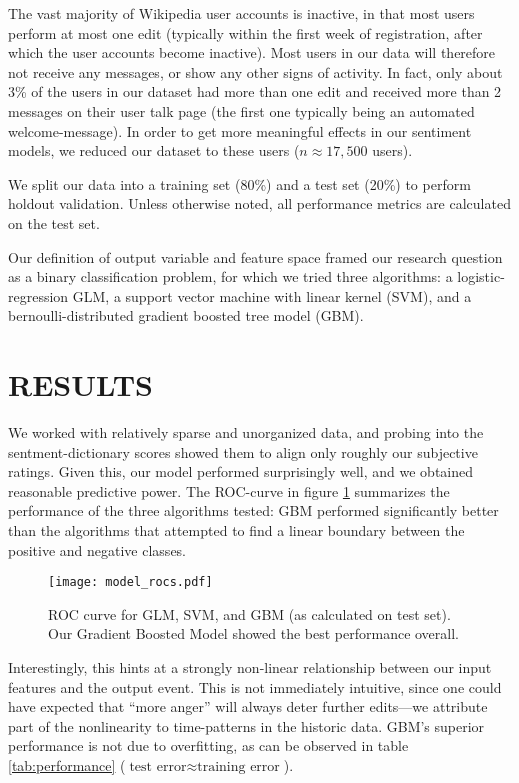 \documentclass[letterpaper, 10 pt, conference]{ieeeconf}  %
\begin{document}
The vast majority of Wikipedia user accounts is inactive, in that most users perform at most one edit (typically within the first week of registration, after which the user accounts become inactive). Most users in our data will therefore not receive any messages, or show any other signs of activity. In fact, only about 3\% of the users in our dataset had more than one edit and received more than 2 messages on their user talk page (the first one typically being an automated welcome-message). In order to get more meaningful effects in our sentiment models, we reduced our dataset to these users ($n\approx 17,500$ users).

We split our data into a training set (80\%) and a test set (20\%) to perform holdout validation. Unless otherwise noted, all performance metrics are calculated on the test set.

Our definition of output variable and feature space framed our research question as a binary classification problem, for which we tried three algorithms: a logistic-regression GLM, a support vector machine with linear kernel (SVM), and a bernoulli-distributed gradient boosted tree model (GBM).



\section{RESULTS}

We worked with relatively sparse and unorganized data, and probing into the sentment-dictionary scores showed them to align only roughly our subjective ratings. Given this, our model performed surprisingly well, and we obtained reasonable predictive power. The ROC-curve in figure \ref{fig:rocs} summarizes the performance of the three algorithms tested: GBM performed significantly better than the algorithms that attempted to find a linear boundary between the positive and negative classes. 

   \begin{figure}[thpb]
      \centering
      \texttt{[image: model\_rocs.pdf]}
      \caption{ROC curve for GLM, SVM, and GBM (as calculated on test set). Our Gradient Boosted Model showed the best performance overall.}
      \label{fig:rocs}
   \end{figure}

Interestingly, this hints at a strongly non-linear relationship between our input features and the output event. This is not immediately intuitive, since one could have expected that ``more anger'' will always deter further edits---we attribute part of the nonlinearity to time-patterns in the historic data. GBM's superior performance is not due to overfitting, as can be observed in table \ref{tab:performance} ($\text{test error} \approx \text{training error}$).
\end{document}
